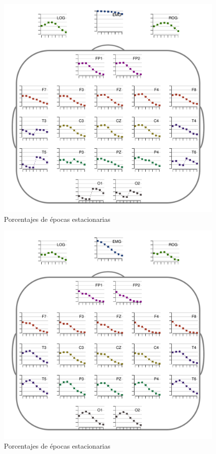 \begin{figure}
\centering
\includegraphics[width=.9\linewidth]{./img_resultados/GH24031950SUENO_cabeza_epocas_.pdf}
\caption{Porcentajes de épocas estacionarias}
\end{figure}

\begin{figure}
\centering
\includegraphics[width=.9\linewidth]{./img_resultados/GURM251148SUE_cabeza_epocas_.pdf}
\caption{Porcentajes de épocas estacionarias}
\end{figure}


